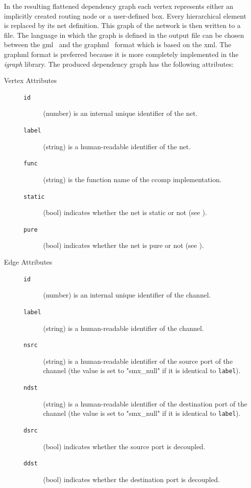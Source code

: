 In the resulting flattened dependency graph each vertex represents either an implicitly created routing node or a user-defined box.
Every hierarchical element is replaced by its net definition.
This graph of the network is then written to a file.
The language in which the graph is defined in the output file can be chosen between the \gls{gml}~\cite{himsolt1996} and the \gls{graphml}~\cite{brandes2001} format which is based on the \gls{xml}.
The \gls{graphml} format is preferred because it is more completely implemented in the \emph{igraph} library.
The produced dependency graph has the following attributes:
\begin{description}
    \item[Vertex Attributes] \hfill
        \begin{description}
            \item[\texttt{id}] (number) is an internal unique identifier of the net.
            \item[\texttt{label}] (string) is a human-readable identifier of the net.
            \item[\texttt{func}] (string) is the function name of the \gls*{ccomp} implementation.
            \item[\texttt{static}] (bool) indicates whether the net is static or not (see \Sect{\ref{sect_smx_box_grammar}}).
            \item[\texttt{pure}] (bool) indicates whether the net is pure or not (see \Sect{\ref{sect_smx_box_grammar}}).
        \end{description}
    \item[Edge Attributes] \hfill
        \begin{description}
            \item[\texttt{id}] (number) is an internal unique identifier of the channel.
            \item[\texttt{label}] (string) is a human-readable identifier of the channel.
            \item[\texttt{nsrc}] (string) is a human-readable identifier of the source port of the channel (the value is set to "smx\_null" if it is identical to \texttt{label}).
            \item[\texttt{ndst}] (string) is a human-readable identifier of the destination port of the channel (the value is set to "smx\_null" if it is identical to \texttt{label}).
            \item[\texttt{dsrc}] (bool) indicates whether the source port is decoupled.
            \item[\texttt{ddst}] (bool) indicates whether the destination port is decoupled.

\end{description}
\end{description}
